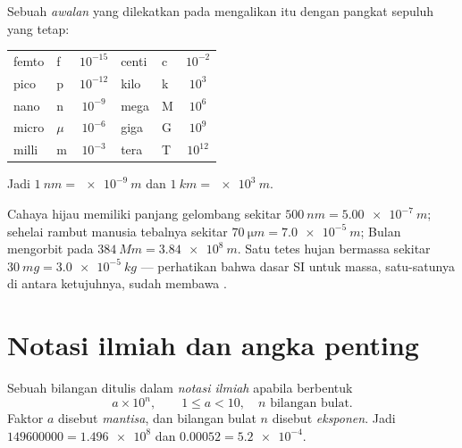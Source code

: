 \begin{definition}[Awalan SI]\label{def:g10:orders-of-magnitude:prefixes}
Sebuah \emph{awalan} yang dilekatkan pada 
mengalikan  itu dengan pangkat sepuluh yang tetap:
\begin{center}
\begin{tabular}{llc@{\qquad\qquad}llc}
femto & f & $10^{-15}$ & centi & c & $10^{-2}$ \\
pico  & p & $10^{-12}$ & kilo  & k & $10^{3}$  \\
nano  & n & $10^{-9}$  & mega  & M & $10^{6}$  \\
micro & $\mu$ & $10^{-6}$ & giga & G & $10^{9}$ \\
milli & m & $10^{-3}$  & tera  & T & $10^{12}$ \\
\end{tabular}
\end{center}
Jadi $\qty{1}{nm} = \qty{e-9}{m}$ dan $\qty{1}{km} = \qty{e3}{m}$.
\end{definition}

\begin{example}\label{ex:g10:orders-of-magnitude:prefixes}
Cahaya hijau memiliki panjang gelombang sekitar
$\qty{500}{nm} = \qty{5.00e-7}{m}$; sehelai rambut manusia tebalnya
sekitar $\qty{70}{\micro m} = \qty{7.0e-5}{m}$; Bulan mengorbit pada
$\qty{384}{Mm} = \qty{3.84e8}{m}$. Satu tetes hujan bermassa sekitar
$\qty{30}{mg} = \qty{3.0e-5}{kg}$ --- perhatikan bahwa  dasar SI
untuk massa, satu-satunya di antara ketujuhnya, sudah membawa .
\end{example}

\section{Notasi ilmiah dan angka penting}

\begin{definition}\label{def:g10:orders-of-magnitude:scinot}
Sebuah bilangan ditulis dalam \emph{notasi ilmiah}
apabila berbentuk
\[
a \times 10^{n}, \qquad 1 \leq a < 10, \quad n \text{ bilangan bulat.}
\]
Faktor $a$ disebut \emph{mantisa}, dan bilangan bulat
$n$ disebut \emph{eksponen}.
Jadi $\num{149600000} = \num{1.496e8}$ dan
$\num{0.00052} = \num{5.2e-4}$.
\end{definition}

